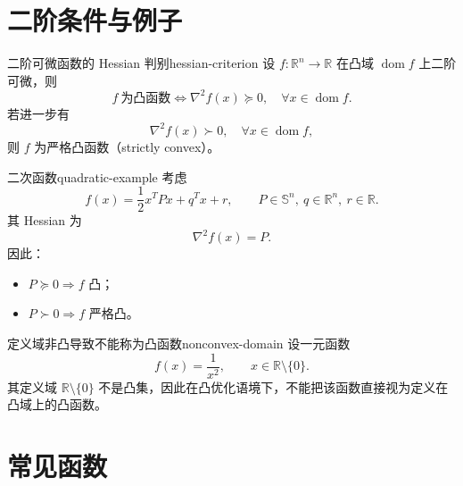 \documentclass[11pt,a4paper]{article}
\begin{document}
\section{二阶条件与例子}\label{sec:ch3-second-order}

\begin{definition}{二阶可微函数的 Hessian 判别}{hessian-criterion}
设 $f:\mathbb{R}^n\to\mathbb{R}$ 在凸域 $\operatorname{dom}f$ 上二阶可微，则
\[
f\ \text{为凸函数}
\iff
\nabla^2 f(x)\succeq 0,\quad \forall x\in\operatorname{dom}f.
\]
若进一步有
\[
\nabla^2 f(x)\succ 0,\quad \forall x\in\operatorname{dom}f,
\]
则 $f$ 为严格凸函数（strictly convex）。
\end{definition}

\begin{example}{二次函数}{quadratic-example}
考虑
\[
f(x)=\frac12 x^TPx+q^Tx+r,\qquad
P\in\mathbb{S}^n,\ q\in\mathbb{R}^n,\ r\in\mathbb{R}.
\]
其 Hessian 为
\[
\nabla^2 f(x)=P.
\]
因此：
\begin{itemize}
  \item $P\succeq 0 \Rightarrow f$ 凸；
  \item $P\succ 0 \Rightarrow f$ 严格凸。
\end{itemize}
\end{example}

\begin{example}{定义域非凸导致不能称为凸函数}{nonconvex-domain}
设一元函数
\[
f(x)=\frac{1}{x^2},\qquad x\in\mathbb{R}\setminus\{0\}.
\]
其定义域 $\mathbb{R}\setminus\{0\}$ 不是凸集，因此在凸优化语境下，不能把该函数直接视为定义在凸域上的凸函数。
\end{example}

\section{常见函数}\label{sec:ch3-common-functions}
\end{document}
